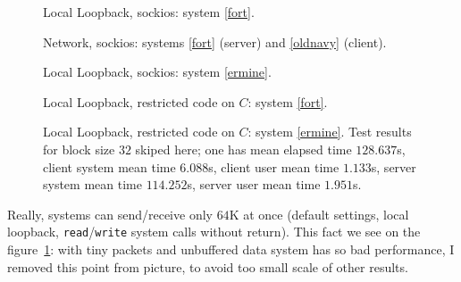 \documentclass[a4paper]{article}
\begin{document}
\begin{figure}
  \begin{center}
    
  \end{center}
  \caption{Local Loopback, sockios: system \ref{fort}.}
\end{figure}

\begin{figure}
  \begin{center}
    
  \end{center}
  \caption{Network, sockios:
           systems \ref{fort} (server) and \ref{oldnavy} (client).}
\end{figure}

\begin{figure}
  \begin{center}
    
  \end{center}
  \caption{Local Loopback, sockios: system \ref{ermine}.}
\end{figure}

\begin{figure}
  \begin{center}
    
  \end{center}
  \caption{Local Loopback, restricted code on $C$: system \ref{fort}.}
\end{figure}

\begin{figure}
  \begin{center}
    
  \end{center}
  \caption{Local Loopback, restricted code on $C$: system \ref{ermine}.
           Test results for block size $32$ skiped here; one has 
           mean elapsed time $128.637$s, client system mean 
           time $6.088$s, client user mean time $1.133$s, server system
           mean time $114.252$s, server user mean time $1.951$s.\label{local-C-ermine}}
\end{figure}

Really, systems can send/receive only $64$K at once
(default settings, local loopback, \texttt{read}/\texttt{write} system calls
without return). This fact we see on the figure~\ref{local-C-ermine}:
with tiny packets and unbuffered data system has so bad performance,
I removed this point from picture, to avoid too small scale of other results.
\end{document}
